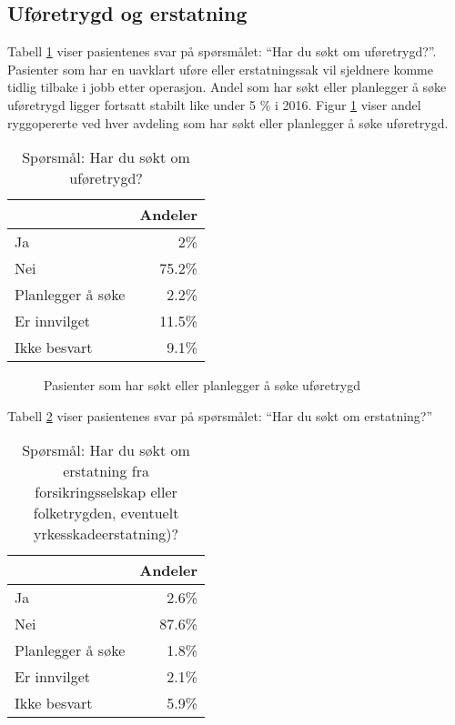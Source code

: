 \documentclass [norsk,a4paper,twoside]{article}\usepackage[]{graphicx}\usepackage[]{color}
\begin{document}


\subsection{Uføretrygd og erstatning }

Tabell \ref{tab:Ufor} viser pasientenes svar på spørsmålet: ``Har du søkt om uføretrygd?''.
Pasienter som har en uavklart uføre eller erstatningssak vil sjeldnere komme tidlig tilbake i jobb etter operasjon.
Andel som har søkt eller planlegger å søke uføretrygd ligger fortsatt stabilt like under 5 \% i 2016. 
Figur \ref{fig:Ufor} viser andel ryggopererte ved hver avdeling som har søkt eller planlegger å søke uføretrygd.

\begin{table}[ht]
\centering
\begin{tabular}{lr}
  \hline
 & Andeler \\ 
  \hline
Ja & 2\% \\ 
  Nei & 75.2\% \\ 
  Planlegger å søke & 2.2\% \\ 
  Er innvilget & 11.5\% \\ 
  Ikke besvart & 9.1\% \\ 
   \hline
\end{tabular}
\caption{Spørsmål: Har du søkt om uføretrygd?} 
\label{tab:Ufor}
\end{table}


\begin{figure}[ht]
\caption{\label{fig:Ufor} Pasienter som har søkt eller planlegger å søke uføretrygd} 
\end{figure}

Tabell \ref{tab:Erst} viser pasientenes svar på spørsmålet: ``Har du søkt om erstatning?'' 

\begin{table}[ht]
\centering
\begin{tabular}{lr}
  \hline
 & Andeler \\ 
  \hline
Ja & 2.6\% \\ 
  Nei & 87.6\% \\ 
  Planlegger å søke & 1.8\% \\ 
  Er innvilget & 2.1\% \\ 
  Ikke besvart & 5.9\% \\ 
   \hline
\end{tabular}
\caption{Spørsmål: Har du søkt om erstatning fra forsikringsselskap eller folketrygden, 
		eventuelt yrkesskadeerstatning)?} 
\label{tab:Erst}
\end{table}
\end{document}

